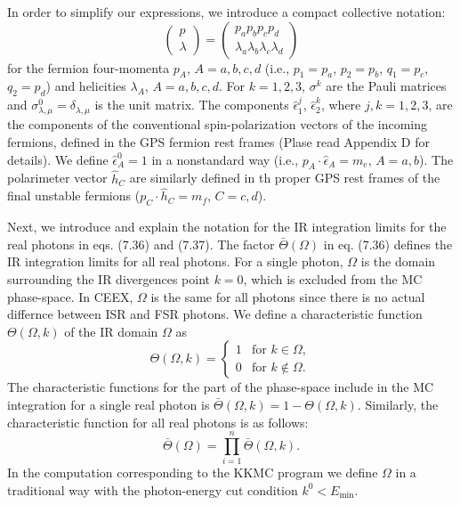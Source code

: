 In order to simplify our expressions, we introduce a compact collective notation:
\begin{equation}
\left(
\begin{array}{c}
 p\\\lambda
\end{array}
\right)
=\left(
\begin{array}{c}
p_ap_bp_cp_d\\\lambda_a\lambda_b\lambda_c\lambda_d
\end{array}
\right)
\end{equation}
for the fermion four-momenta $p_A$, $A=a,b,c,d$ (i.e., $p_1=p_a$, $p_2=p_b$, $q_1=p_c$, $q_2=p_d$) and helicities $\lambda_A$, $A=a,b,c,d$. For $k=1,2,3$, $\sigma^k$ are the Pauli matrices and $\sigma^0_{\lambda,\mu}=\delta_{\lambda,\mu}$ is the unit matrix. The components $\hat{\epsilon}^j_1$, $\hat{\epsilon}^k_2$, where $j,k=1,2,3$, are the components of the conventional spin-polarization vectors of the incoming fermions, defined in the GPS fermion rest frames (Plase read Appendix D for details). We define $\hat{\epsilon}^0_A=1$ in a nonstandard way (i.e., $p_A\cdot \hat{\epsilon}_A=m_e$, $A=a,b$). The polarimeter vector $\hat{h}_C$ are similarly defined in th proper GPS rest frames of the final unstable fermions ($p_C\cdot \hat{h}_C=m_f$, $C=c,d$).

Next, we introduce and explain the notation for the IR integration limits for the real photons in eqs. (7.36) and (7.37). The factor $\bar{\Theta}(\Omega)$ in eq. (7.36) defines the IR integration limits for all real photons. For a single photon, $\Omega$ is the domain surrounding the IR divergences point $k=0$, which is excluded from the MC phase-space. In CEEX, $\Omega$ is the same for all photons since there is no actual differnce between ISR and FSR photons. We define a characteristic function $\Theta(\Omega,k)$ of the IR domain $\Omega$ as 
\begin{equation}
\Theta(\Omega,k)=
\begin{cases}
1 & \text{for }k\in\Omega,\\
0 & \text{for }k\not\in \Omega.
\end{cases}
\end{equation}
The characteristic functions for the part of the phase-space include in the MC integration for a single real photon is $\bar{\Theta}(\Omega,k)=1-\Theta(\Omega,k)$. Similarly, the characteristic function for all real photons is as follows:
\begin{equation}
\bar{\Theta}(\Omega)=\prod_{i=1}^n\bar{\Theta}(\Omega,k).
\end{equation}
In the computation corresponding to the KKMC program we define $\Omega$ in a traditional way with the photon-energy cut condition $k^0<E_\text{min}$.

